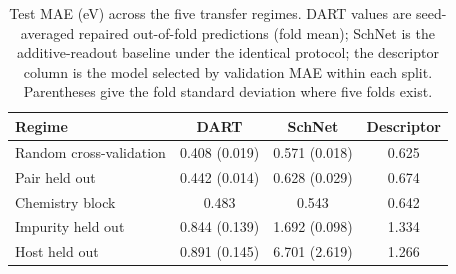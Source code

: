 \begin{table}[t]
\caption{Test MAE (eV) across the five transfer regimes.  DART values are
seed-averaged repaired out-of-fold predictions (fold mean); SchNet is the
additive-readout baseline under the identical protocol; the descriptor
column is the model selected by validation MAE within each split.
Parentheses give the fold standard deviation where five folds exist.}
\label{tab:benchmark}
\centering
\begin{tabular}{lccc}
\toprule
Regime & DART & SchNet & Descriptor \\
\midrule
Random cross-validation & 0.408 (0.019) & 0.571 (0.018) & 0.625 \\
Pair held out & 0.442 (0.014) & 0.628 (0.029) & 0.674 \\
Chemistry block & 0.483 & 0.543 & 0.642 \\
Impurity held out & 0.844 (0.139) & 1.692 (0.098) & 1.334 \\
Host held out & 0.891 (0.145) & 6.701 (2.619) & 1.266 \\
\bottomrule
\end{tabular}
\end{table}
